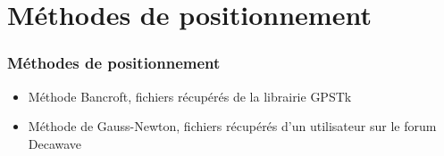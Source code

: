 \documentclass[12pt]{beamer}
\begin{document}
	\section{Méthodes de positionnement}
	\begin{frame}[allowframebreaks]
    	\frametitle{Méthodes de positionnement}
    	    \begin{block}{}
				\begin{itemize}
    	        [triangle]
				    \item Méthode Bancroft, fichiers récupérés de la librairie GPSTk
				    \item Méthode de Gauss-Newton, fichiers récupérés d'un utilisateur sur le forum Decawave
				\end{itemize}
			\end{block}
	\end{frame}
\end{document}
